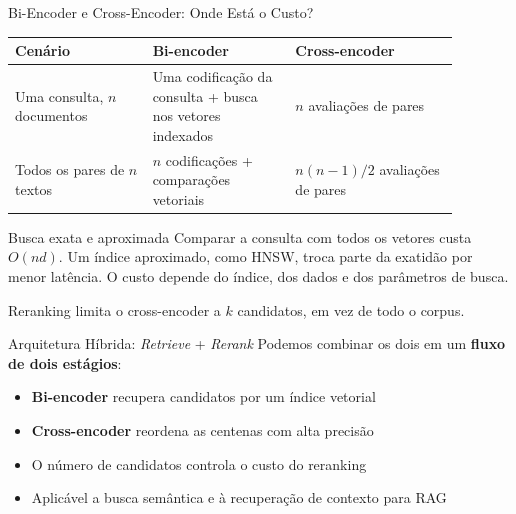 \documentclass[aspectratio=169, xcolor=dvipsnames]{beamer}
\begin{document}
  \begin{frame}{Bi-Encoder e Cross-Encoder: Onde Está o Custo?}
    \begin{tabular}{p{0.27\linewidth}p{0.29\linewidth}p{0.32\linewidth}}
      \toprule
      \textbf{Cenário} & \textbf{Bi-encoder} & \textbf{Cross-encoder}\\
      \midrule
      Uma consulta, $n$ documentos & Uma codificação da consulta + busca nos vetores indexados & $n$ avaliações de pares\\[0.5em]
      Todos os pares de $n$ textos & $n$ codificações + comparações vetoriais & $n(n-1)/2$ avaliações de pares\\
      \bottomrule
    \end{tabular}
    \begin{block}{Busca exata e aproximada}
      Comparar a consulta com todos os vetores custa $O(nd)$.
      Um índice aproximado, como HNSW, troca parte da exatidão por menor latência.
      O custo depende do índice, dos dados e dos parâmetros de busca.
    \end{block}
    Reranking limita o cross-encoder a $k$ candidatos, em vez de todo o corpus.
  \end{frame}


  \begin{frame}{Arquitetura Híbrida: \textit{Retrieve} + \textit{Rerank}}
    Podemos combinar os dois em um \textbf{fluxo de dois estágios}:
    \vspace{0.3em}
    \centering
    \vspace{0.4em}
    \begin{itemize}
      \item \textbf{Bi-encoder} recupera candidatos por um índice vetorial
      \item \textbf{Cross-encoder} reordena as centenas com alta precisão
      \item O número de candidatos controla o custo do reranking
      \item Aplicável a busca semântica e à recuperação de contexto para RAG
    \end{itemize}
  \end{frame}
\end{document}
